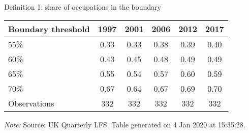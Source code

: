 \begin{center}
\begin{threeparttable}[!h]
\caption{Definition 1: share of occupations in the boundary}
\label{tab:shareBound}
\begin{tabular}{lccccc}
\toprule
\toprule
\textbf{Boundary threshold}&\multicolumn{1}{c}{\textbf{1997}}&\multicolumn{1}{c}{\textbf{2001}}&\multicolumn{1}{c}{\textbf{2006}}&\multicolumn{1}{c}{\textbf{2012}}&\multicolumn{1}{c}{\textbf{2017}} \\
\midrule
55\%        &        0.33&        0.33&        0.38&        0.39&        0.40\\
60\%        &        0.43&        0.45&        0.48&        0.49&        0.49\\
65\%        &        0.55&        0.54&        0.57&        0.60&        0.59\\
70\%        &        0.67&        0.64&        0.67&        0.69&        0.70\\
\midrule Observations&         332&         332&         332&         332&         332\\
\bottomrule
\bottomrule
\end{tabular}
\begin{tablenotes}
\item\footnotesize\textit{Note:} Source: UK Quarterly LFS. Table generated on  4 Jan 2020 at 15:35:28.
\end{tablenotes}
\end{threeparttable}
\end{center}
